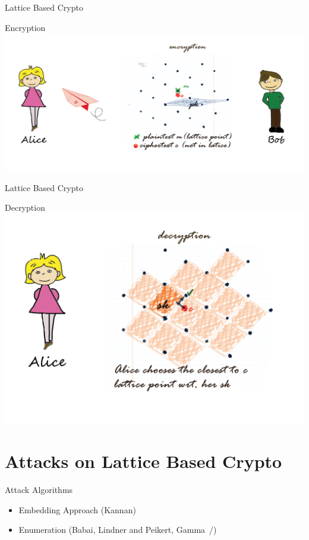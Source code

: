 \begin{frame}{Lattice Based Crypto}
    \begin{block}{Encryption}
        \centering
        \includegraphics[keepaspectratio,width=\textwidth,height=0.8\textheight]{data/encryption}
    \end{block}
\end{frame}

\begin{frame}{Lattice Based Crypto}
    \begin{block}{Decryption}
        \centering
        \includegraphics[keepaspectratio,width=\textwidth,height=0.8\textheight]{data/decryption}
    \end{block}
\end{frame}

\section{Attacks on Lattice Based Crypto}
\begin{frame}{Attack Algorithms}
    \begin{itemize}
        \item Embedding Approach (Kannan)
        \item Enumeration (Babai, Lindner and Peikert, Gamma~\etal/)
    \end{itemize}
\end{frame}

